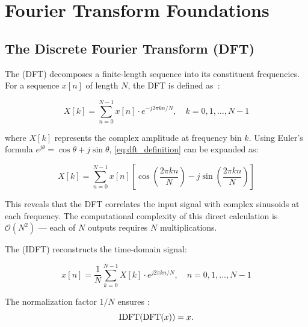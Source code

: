 \section{Fourier Transform Foundations}\label{sec:fourier}

\subsection{The Discrete Fourier Transform (DFT)}\label{subsec:dft}

The  (DFT) decomposes a
finite-length sequence into its constituent frequencies. For a
sequence $x[n]$ of length $N$, the DFT is defined
as~\cite{oppenheim1999discrete}:

\begin{equation}
  \label{eq:dft_definition}
  X[k] = \sum_{n=0}^{N-1} x[n] \cdot e^{-j2\pi kn/N}, \quad k = 0, 1,
  \ldots, N-1
\end{equation}

where $X[k]$ represents the complex amplitude at frequency bin $k$.
Using Euler's formula $e^{j\theta} = \cos\theta + j\sin\theta$,
\cref{eq:dft_definition} can be expanded as:

\begin{equation}
  \label{eq:dft_expanded}
  X[k] = \sum_{n=0}^{N-1} x[n] \left[\cos\left(\frac{2\pi
  kn}{N}\right) - j\sin\left(\frac{2\pi kn}{N}\right)\right]
\end{equation}

This reveals that the DFT correlates the input signal with complex
sinusoids at each frequency. The computational complexity of this
direct calculation is $\mathcal{O}(N^2)$ --- each of $N$ outputs
requires $N$ multiplications.

The  (IDFT) reconstructs the time-domain signal:

\begin{equation}
  \label{eq:idft}
  x[n] = \frac{1}{N}\sum_{k=0}^{N-1} X[k] \cdot e^{j2\pi kn/N}, \quad
  n = 0, 1, \ldots, N-1
\end{equation}

The normalization factor $1/N$ ensures :
\[
  \operatorname{IDFT}(\operatorname{DFT}(x)) = x.
\]

